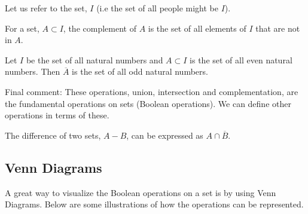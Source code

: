 Let us refer to the set, $I$  (i.e the set of all people might be $I$). 
\begin{definition}
For a set, $A\subset I$, the complement of $A$ is the set of all elements of $I$ that are not in $A$.  
\end{definition}
\begin{example}
Let $I$ be the set of all natural numbers and $A\subset I$ is the set of all even natural numbers.  Then $\overline A$ is the set of all odd natural numbers.
\end{example}
\begin{remark} [$\overline{\overline{A}} = A$]
\end{remark}

Final comment:  These operations, union, intersection and complementation, are the fundamental operations on sets (Boolean operations).  We can define other operations in terms of these. 
\begin{example}[$A-B$]
The difference of two sets, $A-B$, can be expressed as $A\cap \overline B$.
\end{example}

\newpage
\subsection*{Venn Diagrams}
A great way to visualize the Boolean operations on a set is by using Venn Diagrams.   Below are some illustrations of how the operations can be represented.

